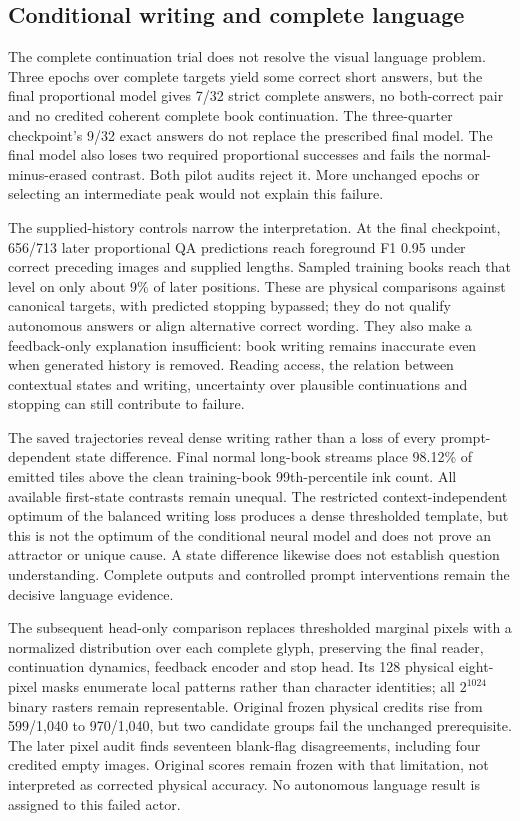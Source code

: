 \subsection*{Conditional writing and complete language}
The complete continuation trial does not resolve the visual language problem.
Three epochs over complete targets yield some correct short answers, but the
final proportional model gives 7/32 strict complete answers, no both-correct
pair and no credited coherent complete book continuation. The three-quarter
checkpoint's 9/32 exact answers do not replace the prescribed final model.
The final model also loses two required proportional successes and fails the
normal-minus-erased contrast. Both pilot audits reject it. More unchanged
epochs or selecting an intermediate peak would not explain this failure.

The supplied-history controls narrow the interpretation. At the final
checkpoint, 656/713 later proportional QA predictions reach foreground F1 0.95
under correct preceding images and supplied lengths. Sampled training books
reach that level on only about 9\% of later positions. These are physical
comparisons against canonical targets, with predicted stopping bypassed;
they do not qualify autonomous answers or align alternative correct wording.
They also make a feedback-only explanation insufficient: book writing remains
inaccurate even when generated history is removed. Reading access, the relation
between contextual states and writing, uncertainty over plausible continuations
and stopping can still contribute to failure.

The saved trajectories reveal dense writing rather than a loss of every
prompt-dependent state difference. Final normal long-book streams place
98.12\% of emitted tiles above the clean training-book 99th-percentile ink
count. All available first-state contrasts remain unequal. The restricted
context-independent optimum of the balanced writing loss produces a dense
thresholded template, but this is not the optimum of the conditional neural
model and does not prove an attractor or unique cause. A state difference
likewise does not establish question understanding. Complete outputs and
controlled prompt interventions remain the decisive language evidence.

The subsequent head-only comparison replaces thresholded marginal pixels with
a normalized distribution over each complete glyph, preserving the final
reader, continuation dynamics, feedback encoder and stop head. Its 128 physical
eight-pixel masks enumerate local patterns rather than character identities;
all $2^{1024}$ binary rasters remain representable. Original frozen physical
credits rise from 599/1,040 to 970/1,040, but two candidate groups fail the
unchanged prerequisite. The later pixel audit finds seventeen blank-flag
disagreements, including four credited empty images. Original scores remain
frozen with that limitation, not interpreted as corrected physical accuracy.
No autonomous language result is assigned to this failed actor.

